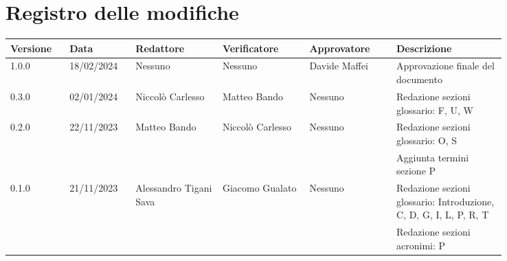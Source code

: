 \section*{Registro delle modifiche}
{
\renewcommand{\arraystretch}{1.5}
\scriptsize
\begin{longtable}{p{0.10\linewidth}p{0.10\linewidth}p{0.15\linewidth}p{0.15\linewidth}p{0.15\linewidth}p{0.19\linewidth}}
	\textbf{Versione} & \textbf{Data} & \textbf{Redattore}     & \textbf{Verificatore} & \textbf{Approvatore} & \textbf{Descrizione}	\\
	\toprule
	1.0.0	& 18/02/2024	& Nessuno				& Nessuno				& Davide Maffei	& Approvazione finale del documento	\\
	\hline
	0.3.0	& 02/01/2024    & Niccolò Carlesso		&	Matteo Bando		& Nessuno	& Redazione sezioni glossario: F, U, W	\\
	\hline
	0.2.0	& 22/11/2023    & Matteo Bando			&	Niccolò Carlesso	& Nessuno	& Redazione sezioni glossario: O, S	\\
			&               &						&						& 			& Aggiunta termini sezione P		\\
	\hline
	0.1.0	& 21/11/2023    & Alessandro Tigani Sava &	Giacomo Gualato		& Nessuno	& Redazione sezioni glossario: Introduzione, C, D, G, I, L, P, R, T 	\\
			&               &						&						&			& Redazione sezioni acronimi: P		\\
	\bottomrule
\end{longtable}
}
